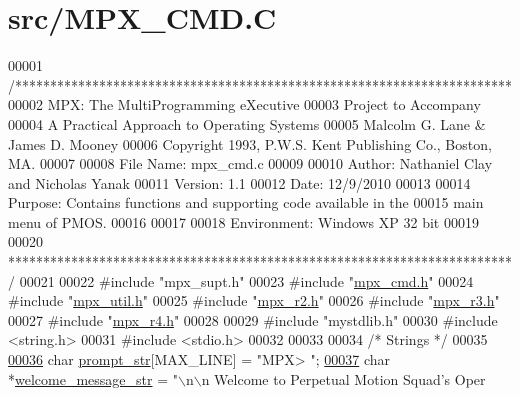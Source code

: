 \hypertarget{_m_p_x___c_m_d_8_c_source}{
\section{src/MPX\_\-CMD.C}
}

\begin{DoxyCode}
00001 \textcolor{comment}{/***********************************************************************}
00002 \textcolor{comment}{        MPX: The MultiProgramming eXecutive}
00003 \textcolor{comment}{        Project to Accompany}
00004 \textcolor{comment}{        A Practical Approach to Operating Systems}
00005 \textcolor{comment}{        Malcolm G. Lane & James D. Mooney}
00006 \textcolor{comment}{        Copyright 1993, P.W.S. Kent Publishing Co., Boston, MA.}
00007 \textcolor{comment}{}
00008 \textcolor{comment}{        File Name:      mpx\_cmd.c}
00009 \textcolor{comment}{}
00010 \textcolor{comment}{        Author: Nathaniel Clay and Nicholas Yanak}
00011 \textcolor{comment}{        Version: 1.1}
00012 \textcolor{comment}{        Date:  12/9/2010}
00013 \textcolor{comment}{}
00014 \textcolor{comment}{        Purpose: Contains functions and supporting code available in the}
00015 \textcolor{comment}{        main menu of PMOS.}
00016 \textcolor{comment}{}
00017 \textcolor{comment}{                }
00018 \textcolor{comment}{        Environment: Windows XP 32 bit}
00019 \textcolor{comment}{}
00020 \textcolor{comment}{************************************************************************/}
00021 
00022 \textcolor{preprocessor}{#include "mpx\_supt.h"}
00023 \textcolor{preprocessor}{#include "\hyperlink{mpx__cmd_8h}{mpx_cmd.h}"}
00024 \textcolor{preprocessor}{#include "\hyperlink{mpx__util_8h}{mpx_util.h}"}
00025 \textcolor{preprocessor}{#include "\hyperlink{mpx__r2_8h}{mpx_r2.h}"}
00026 \textcolor{preprocessor}{#include "\hyperlink{_m_p_x___r3_8_h}{mpx_r3.h}"}
00027 \textcolor{preprocessor}{#include "\hyperlink{mpx__r4_8h}{mpx_r4.h}"}
00028 
00029 \textcolor{preprocessor}{#include "mystdlib.h"}
00030 \textcolor{preprocessor}{#include <string.h>}
00031 \textcolor{preprocessor}{#include <stdio.h>}
00032 
00033 
00034 \textcolor{comment}{/* Strings */}
00035 
\hypertarget{_m_p_x___c_m_d_8_c_source_l00036}{}\hyperlink{_m_p_x___c_m_d_8_c_a4d455760d7d89fa6a1c1559f7b6acdf7}{00036} \textcolor{keywordtype}{char} \hyperlink{_m_p_x___c_m_d_8_c_a4d455760d7d89fa6a1c1559f7b6acdf7}{prompt_str}[MAX\_LINE]       = \textcolor{stringliteral}{"MPX> "}; 
\hypertarget{_m_p_x___c_m_d_8_c_source_l00037}{}\hyperlink{_m_p_x___c_m_d_8_c_a9f8c83d01b06ce3619ac78c395f9cdd1}{00037} \textcolor{keywordtype}{char} *\hyperlink{_m_p_x___c_m_d_8_c_a9f8c83d01b06ce3619ac78c395f9cdd1}{welcome_message_str}       = \textcolor{stringliteral}{"\(\backslash\)n\(\backslash\)n  Welcome to Perpetual Motion Squad's Oper
}
\end{DoxyCode}
